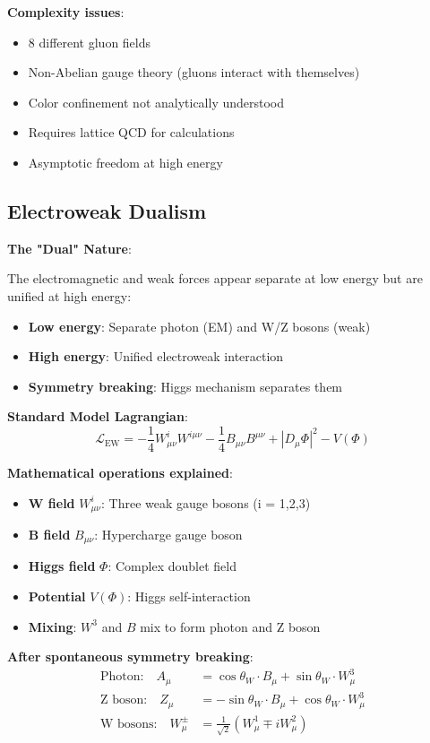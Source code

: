 \documentclass[12pt,a4paper]{article}
\newcommand{\Lag}{\mathcal{L}}
\theoremstyle{definition}
\theoremstyle{remark}
\begin{document}
	\textbf{Complexity issues}:
	\begin{itemize}
		\item 8 different gluon fields
		\item Non-Abelian gauge theory (gluons interact with themselves)
		\item Color confinement not analytically understood
		\item Requires lattice QCD for calculations
		\item Asymptotic freedom at high energy
	\end{itemize}
	
	\subsection{Electroweak Dualism}
	
	\textbf{The "Dual" Nature}:
	
	The electromagnetic and weak forces appear separate at low energy but are unified at high energy:
	
	\begin{itemize}
		\item \textbf{Low energy}: Separate photon (EM) and W/Z bosons (weak)
		\item \textbf{High energy}: Unified electroweak interaction
		\item \textbf{Symmetry breaking}: Higgs mechanism separates them
	\end{itemize}
	
	\textbf{Standard Model Lagrangian}:
	\begin{equation}
		\Lag_{\text{EW}} = -\frac{1}{4} W_{\mu\nu}^i W^{i\mu\nu} - \frac{1}{4} B_{\mu\nu} B^{\mu\nu} + |D_\mu \Phi|^2 - V(\Phi)
	\end{equation}
	
	\textbf{Mathematical operations explained}:
	\begin{itemize}
		\item \textbf{W field} $W_{\mu\nu}^i$: Three weak gauge bosons (i = 1,2,3)
		\item \textbf{B field} $B_{\mu\nu}$: Hypercharge gauge boson
		\item \textbf{Higgs field} $\Phi$: Complex doublet field
		\item \textbf{Potential} $V(\Phi)$: Higgs self-interaction
		\item \textbf{Mixing}: $W^3$ and $B$ mix to form photon and Z boson
	\end{itemize}
	
	\textbf{After spontaneous symmetry breaking}:
	\begin{align}
		\text{Photon:} \quad A_\mu &= \cos\theta_W \cdot B_\mu + \sin\theta_W \cdot W_\mu^3 \\
		\text{Z boson:} \quad Z_\mu &= -\sin\theta_W \cdot B_\mu + \cos\theta_W \cdot W_\mu^3 \\
		\text{W bosons:} \quad W_\mu^\pm &= \frac{1}{\sqrt{2}}(W_\mu^1 \mp i W_\mu^2)
	\end{align}
	
\end{document}
